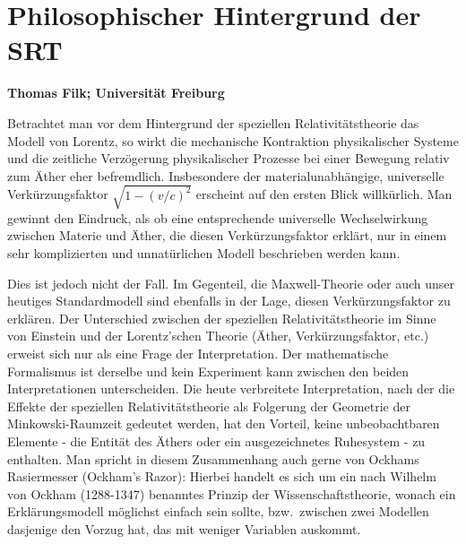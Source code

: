 
\setcounter{page}{1}
\setcounter{section}{0}
\setcounter{figure}{0}
\setcounter{equation}{0}
\setcounter{table}{0}
\setcounter{footnote}{0}

\section*{Philosophischer Hintergrund der SRT}
\noindent
{\bf Thomas Filk; Universit\"at Freiburg}
\vspace{1cm}

\label{chap_Philosophie-SRT}

\noindent
Betrachtet man vor dem Hintergrund der speziellen 
Relativit\"atstheorie das Modell von Lorentz, so  
wirkt die mechanische Kontraktion physikalischer Systeme
und die zeitliche Verz\"ogerung physikalischer Prozesse
bei einer Bewegung relativ zum \"Ather
eher befremdlich. Insbesondere der 
material\-un\-ab\-h\"angige, universelle Verk\"urzungsfaktor $\sqrt{1-(v/c)^2}$ 
erscheint auf den ersten Blick willk\"urlich. Man gewinnt den Eindruck, als ob
eine entsprechende universelle Wechselwirkung zwischen Materie und
\"Ather, die diesen Verk\"urzungsfaktor erkl\"art, nur in einem sehr 
komplizierten und unnat\"urlichen Modell beschrieben werden kann.

Dies ist jedoch nicht der Fall. Im Gegenteil, die
Maxwell-Theorie oder auch unser heutiges Standardmodell sind ebenfalls in 
der Lage, diesen Verk\"urzungsfaktor zu erkl\"aren. Der Unterschied
zwischen der speziellen Relativit\"atstheorie im Sinne von Einstein und der Lorentz'schen
Theorie (\"Ather, Verk\"urzungsfaktor, etc.) erweist sich nur als eine 
Frage der Interpretation. Der mathematische Formalismus ist derselbe und kein
Experiment kann zwischen den beiden Interpretationen unterscheiden. 
Die heute verbreitete Interpretation, nach der die Effekte der speziellen Relativit\"atstheorie
als Folgerung der Geometrie der Minkowski-Raumzeit gedeutet werden, hat den
Vorteil, keine unbeobachtbaren Elemente - die Entit\"at des \"Athers oder ein ausgezeichnetes
Ruhesystem - zu enthalten. Man spricht in diesem Zusammenhang auch gerne
von Ockhams Rasiermesser (Ockham's Razor): Hierbei handelt es sich um ein nach
Wilhelm von Ockham (1288-1347) benanntes Prinzip der Wissenschaftstheorie, wonach
ein Erkl\"arungsmodell m\"oglichst einfach sein sollte, bzw.\ zwischen zwei Modellen dasjenige
den Vorzug hat, das mit weniger Variablen auskommt.   

